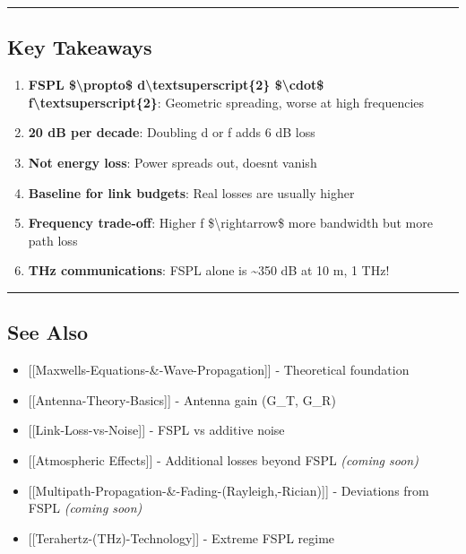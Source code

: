 \begin{center}\rule{0.5\linewidth}{0.5pt}\end{center}

\subsection{\texorpdfstring{ Key
Takeaways}{ Key Takeaways}}\label{key-takeaways}

\begin{enumerate}
\def\labelenumi{\arabic{enumi}.}
\tightlist
\item
  \textbf{FSPL \$\textbackslash propto\$
  d\textbackslash textsuperscript\{2\} \$\textbackslash cdot\$
  f\textbackslash textsuperscript\{2\}}: Geometric spreading, worse at
  high frequencies
\item
  \textbf{20 dB per decade}: Doubling d or f adds 6 dB loss
\item
  \textbf{Not energy loss}: Power spreads out, doesn\textquotesingle t
  vanish
\item
  \textbf{Baseline for link budgets}: Real losses are usually higher
\item
  \textbf{Frequency trade-off}: Higher f \$\textbackslash rightarrow\$
  more bandwidth but more path loss
\item
  \textbf{THz communications}: FSPL alone is \textasciitilde350 dB at 10
  m, 1 THz!
\end{enumerate}

\begin{center}\rule{0.5\linewidth}{0.5pt}\end{center}

\subsection{\texorpdfstring{ See Also}{ See Also}}\label{see-also}

\begin{itemize}
\tightlist
\item
  {[}{[}Maxwell\textquotesingle s-Equations-\&-Wave-Propagation{]}{]} -
  Theoretical foundation
\item
  {[}{[}Antenna-Theory-Basics{]}{]} - Antenna gain (G\_T, G\_R)
\item
  {[}{[}Link-Loss-vs-Noise{]}{]} - FSPL vs additive noise
\item
  {[}{[}Atmospheric Effects{]}{]} - Additional losses beyond FSPL
  \emph{(coming soon)}
\item
  {[}{[}Multipath-Propagation-\&-Fading-(Rayleigh,-Rician){]}{]} -
  Deviations from FSPL \emph{(coming soon)}
\item
  {[}{[}Terahertz-(THz)-Technology{]}{]} - Extreme FSPL regime
\end{itemize}

